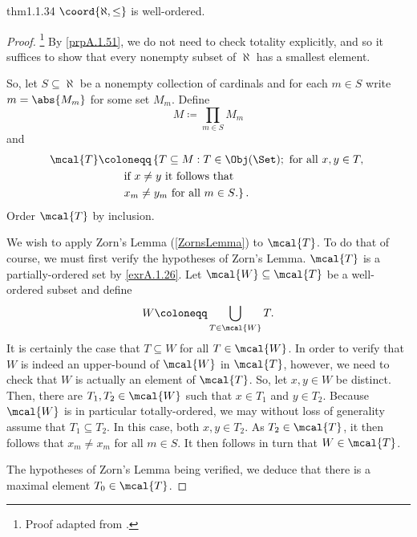 \begin{thm}{}{thm1.1.34}
$\coord{\aleph ,\leq}$ is well-ordered.
\begin{proof}\footnote{Proof adapted from \cite{Honig}.}
By \cref{prpA.1.51}, we do not need to check totality explicitly, and so it suffices to show that every nonempty subset of $\aleph$ has a smallest element.

So, let $S\subseteq \aleph$ be a nonempty collection of cardinals and for each $m\in S$ write $m=\abs{M_m}$ for some set $M_m$.  Define
\begin{equation}
M\coloneqq \prod _{m\in S}M_m
\end{equation}
and
\begin{equation}\label{1.1.39}
\begin{split}
\mcal{T} & \coloneqq \left\{ T\subseteq M:T\in \Obj (\Set );\text{ for all }x,y\in T,\right. \\ & \qquad \left. \text{if }x\neq y\text{ it follows that} \right. \\ & \qquad \left. x_m\neq y_m\text{ for all }m\in S\text{.}\right\} .
\end{split}
\end{equation}
Order $\mcal{T}$ by inclusion.

We wish to apply Zorn's Lemma (\cref{ZornsLemma}) to $\mcal{T}$.  To do that of course, we must first verify the hypotheses of Zorn's Lemma.  $\mcal{T}$ is a partially-ordered set by \cref{exrA.1.26}.  Let $\mcal{W}\subseteq \mcal{T}$ be a well-ordered subset and define
\begin{equation}
W\coloneqq \bigcup _{T\in \mcal{W}}T.
\end{equation}
It is certainly the case that $T\subseteq W$ for all $T\in \mcal{W}$.  In order to verify that $W$ is indeed an upper-bound of $\mcal{W}$ in $\mcal{T}$, however, we need to check that $W$ is actually an element of $\mcal{T}$.  So, let $x,y\in W$ be distinct.  Then, there are $T_1,T_2\in \mcal{W}$ such that $x\in T_1$ and $y\in T_2$.  Because $\mcal{W}$ is in particular totally-ordered, we may without loss of generality assume that $T_1\subseteq T_2$.  In this case, both $x,y\in T_2$.  As $T_2\in \mcal{T}$, it then follows that $x_m\neq x_m$ for all $m\in S$.  It then follows in turn that $W\in \mcal{T}$.

The hypotheses of Zorn's Lemma being verified, we deduce that there is a maximal element $T_0\in \mcal{T}$.


\end{proof}
\end{thm}
